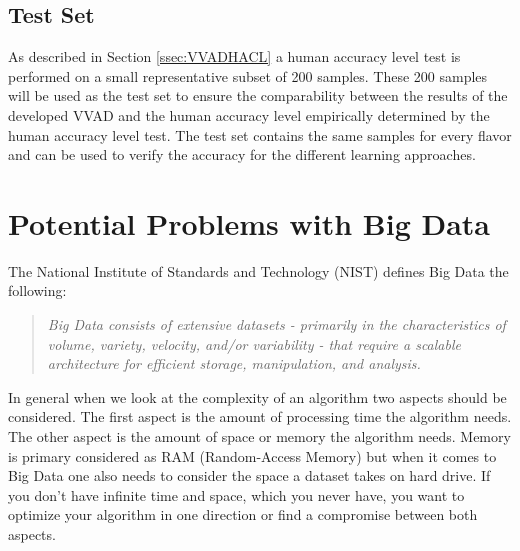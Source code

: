 \subsection{Test Set}\label{ssec:testset}
As described in Section \ref{ssec:VVADHACL} a human accuracy level test is performed on a small representative subset of 200 samples.
These 200 samples will be used as the test set to ensure the comparability between the results of the developed VVAD and the human accuracy level empirically determined by the human accuracy level test.
The test set contains the same samples for every flavor and can be used to verify the accuracy for the different learning approaches.




\section{Potential Problems with Big Data}\label{sec:problemsBigData}
The National Institute of Standards and Technology (NIST) defines Big Data the following: 
\begin{quote}
\textit{Big Data consists of extensive datasets - primarily in the characteristics of volume, variety, velocity, and/or
variability - that require a scalable architecture for efficient storage, manipulation, and analysis.}\cite{NIST2018}
\end{quote}
In general when we look at the complexity of an algorithm two aspects should be considered. The first aspect is the amount of processing time the algorithm needs. The other aspect is the amount of space or memory the algorithm needs. Memory is primary considered as RAM (Random-Access Memory) but when it comes to Big Data one also needs to consider the space a dataset takes on hard drive. 
If you don't have infinite time and space, which you never have, you want to optimize your algorithm in one direction or find a compromise between both aspects.

